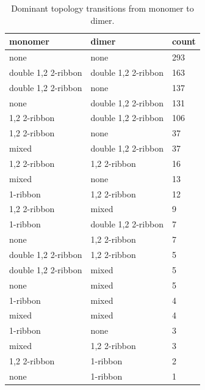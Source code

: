 \begin{table}[ht]
\centering
\caption{Dominant topology transitions from monomer to dimer.}
\label{tab:transition_counts}
\begin{tabular}{lll}
\hline
monomer & dimer & count \\
\hline
none & none & 293 \\
double 1,2 2-ribbon & double 1,2 2-ribbon & 163 \\
double 1,2 2-ribbon & none & 137 \\
none & double 1,2 2-ribbon & 131 \\
1,2 2-ribbon & double 1,2 2-ribbon & 106 \\
1,2 2-ribbon & none &  37 \\
mixed & double 1,2 2-ribbon &  37 \\
1,2 2-ribbon & 1,2 2-ribbon &  16 \\
mixed & none &  13 \\
1-ribbon & 1,2 2-ribbon &  12 \\
1,2 2-ribbon & mixed &   9 \\
1-ribbon & double 1,2 2-ribbon &   7 \\
none & 1,2 2-ribbon &   7 \\
double 1,2 2-ribbon & 1,2 2-ribbon &   5 \\
double 1,2 2-ribbon & mixed &   5 \\
none & mixed &   5 \\
1-ribbon & mixed &   4 \\
mixed & mixed &   4 \\
1-ribbon & none &   3 \\
mixed & 1,2 2-ribbon &   3 \\
1,2 2-ribbon & 1-ribbon &   2 \\
none & 1-ribbon &   1 \\
\hline
\end{tabular}
\end{table}
